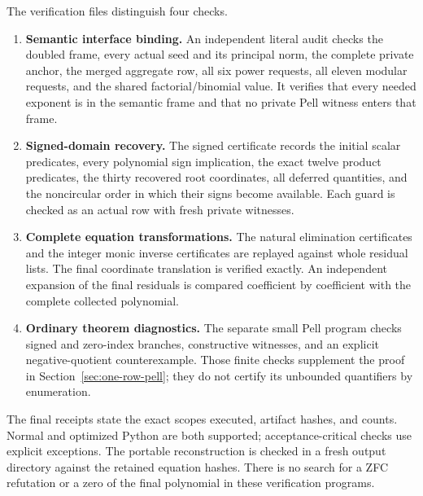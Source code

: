 The verification files distinguish four checks.
\begin{enumerate}
\item \textbf{Semantic interface binding.} An independent literal audit checks the doubled frame, every actual seed and its principal norm, the complete private anchor, the merged aggregate row, all six power requests, all eleven modular requests, and the shared factorial/binomial value. It verifies that every needed exponent is in the semantic frame and that no private Pell witness enters that frame.
\item \textbf{Signed-domain recovery.} The signed certificate records the initial scalar predicates, every polynomial sign implication, the exact twelve product predicates, the thirty recovered root coordinates, all deferred quantities, and the noncircular order in which their signs become available. Each guard is checked as an actual row with fresh private witnesses.
\item \textbf{Complete equation transformations.} The natural elimination certificates and the integer monic inverse certificates are replayed against whole residual lists. The final coordinate translation is verified exactly. An independent expansion of the final residuals is compared coefficient by coefficient with the complete collected polynomial.
\item \textbf{Ordinary theorem diagnostics.} The separate small Pell program checks signed and zero-index branches, constructive witnesses, and an explicit negative-quotient counterexample. Those finite checks supplement the proof in Section~\ref{sec:one-row-pell}; they do not certify its unbounded quantifiers by enumeration.
\end{enumerate}

The final receipts state the exact scopes executed, artifact hashes, and counts. Normal and optimized Python are both supported; acceptance-critical checks use explicit exceptions. The portable reconstruction is checked in a fresh output directory against the retained equation hashes. There is no search for a ZFC refutation or a zero of the final polynomial in these verification programs.
